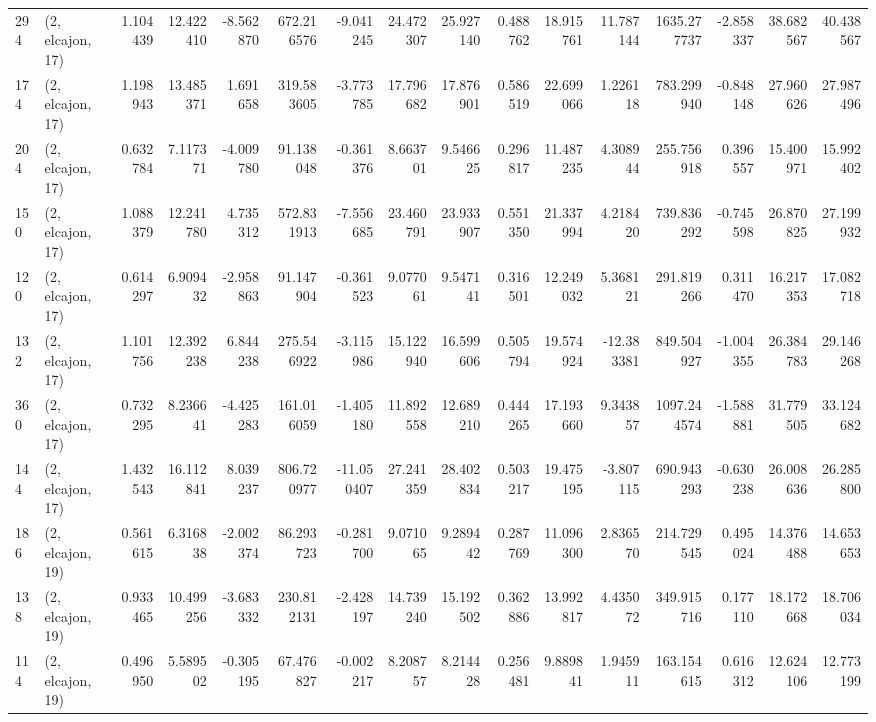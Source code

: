 \begin{tabular}{llrrrrrrrrrrrrrr}
294 &  (2, elcajon, 17) &   1.104439 &  12.422410 &  -8.562870 &   672.216576 &  -9.041245 &  24.472307 &  25.927140 &  0.488762 &  18.915761 &  11.787144 &   1635.277737 &   -2.858337 &   38.682567 &   40.438567 \\
174 &  (2, elcajon, 17) &   1.198943 &  13.485371 &   1.691658 &   319.583605 &  -3.773785 &  17.796682 &  17.876901 &  0.586519 &  22.699066 &   1.226118 &    783.299940 &   -0.848148 &   27.960626 &   27.987496 \\
204 &  (2, elcajon, 17) &   0.632784 &   7.117371 &  -4.009780 &    91.138048 &  -0.361376 &   8.663701 &   9.546625 &  0.296817 &  11.487235 &   4.308944 &    255.756918 &    0.396557 &   15.400971 &   15.992402 \\
150 &  (2, elcajon, 17) &   1.088379 &  12.241780 &   4.735312 &   572.831913 &  -7.556685 &  23.460791 &  23.933907 &  0.551350 &  21.337994 &   4.218420 &    739.836292 &   -0.745598 &   26.870825 &   27.199932 \\
120 &  (2, elcajon, 17) &   0.614297 &   6.909432 &  -2.958863 &    91.147904 &  -0.361523 &   9.077061 &   9.547141 &  0.316501 &  12.249032 &   5.368121 &    291.819266 &    0.311470 &   16.217353 &   17.082718 \\
132 &  (2, elcajon, 17) &   1.101756 &  12.392238 &   6.844238 &   275.546922 &  -3.115986 &  15.122940 &  16.599606 &  0.505794 &  19.574924 & -12.383381 &    849.504927 &   -1.004355 &   26.384783 &   29.146268 \\
360 &  (2, elcajon, 17) &   0.732295 &   8.236641 &  -4.425283 &   161.016059 &  -1.405180 &  11.892558 &  12.689210 &  0.444265 &  17.193660 &   9.343857 &   1097.244574 &   -1.588881 &   31.779505 &   33.124682 \\
144 &  (2, elcajon, 17) &   1.432543 &  16.112841 &   8.039237 &   806.720977 & -11.050407 &  27.241359 &  28.402834 &  0.503217 &  19.475195 &  -3.807115 &    690.943293 &   -0.630238 &   26.008636 &   26.285800 \\
186 &  (2, elcajon, 19) &   0.561615 &   6.316838 &  -2.002374 &    86.293723 &  -0.281700 &   9.071065 &   9.289442 &  0.287769 &  11.096300 &   2.836570 &    214.729545 &    0.495024 &   14.376488 &   14.653653 \\
138 &  (2, elcajon, 19) &   0.933465 &  10.499256 &  -3.683332 &   230.812131 &  -2.428197 &  14.739240 &  15.192502 &  0.362886 &  13.992817 &   4.435072 &    349.915716 &    0.177110 &   18.172668 &   18.706034 \\
114 &  (2, elcajon, 19) &   0.496950 &   5.589502 &  -0.305195 &    67.476827 &  -0.002217 &   8.208757 &   8.214428 &  0.256481 &   9.889841 &   1.945911 &    163.154615 &    0.616312 &   12.624106 &   12.773199 \\

\end{tabular}
